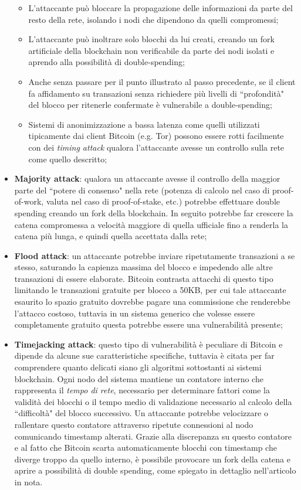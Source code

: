 \begin{itemize}
				\begin{itemize}
					\item L'attaccante può bloccare la propagazione delle informazioni da parte del resto della rete, isolando i nodi che dipendono da quelli compromessi;
					\item L'attaccante può inoltrare solo blocchi da lui creati, creando un fork artificiale della blockchain non verificabile da parte dei nodi isolati e aprendo alla possibilità di double-spending;
					\item Anche senza passare per il punto illustrato al passo precedente, se il client fa affidamento su transazioni senza richiedere più livelli di ``profondità" del blocco per ritenerle confermate è vulnerabile a double-spending;
					\item Sistemi di anonimizzazione a bassa latenza come quelli utilizzati tipicamente dai client Bitcoin (e.g. Tor) possono essere rotti facilmente con dei \emph{timing attack} qualora l'attaccante avesse un controllo sulla rete come quello descritto;
				\end{itemize}
				\item \textbf{Majority attack}: qualora un attaccante avesse il controllo della maggior parte del ``potere di consenso" nella rete (potenza di calcolo nel caso di proof-of-work, valuta nel caso di proof-of-stake, etc.) potrebbe effettuare double spending creando un fork della blockchain. In seguito potrebbe far crescere la catena compromessa a velocità maggiore di quella ufficiale fino a renderla la catena più lunga, e quindi quella accettata dalla rete;
				\item \textbf{Flood attack}: un attaccante potrebbe inviare ripetutamente transazioni a se stesso, saturando la capienza massima del blocco e impedendo alle altre transazioni di essere elaborate. Bitcoin contrasta attacchi di questo tipo limitando le transazioni gratuite per blocco a 50KB, per cui tale attaccante esaurito lo spazio gratuito dovrebbe pagare una commissione che renderebbe l'attacco costoso, tuttavia in un sistema generico che volesse essere completamente gratuito questa potrebbe essere una vulnerabilità presente;
				\item \textbf{Timejacking attack}\cite{timejacking}: questo tipo di vulnerabilità è peculiare di Bitcoin e dipende da alcune sue caratteristiche specifiche, tuttavia è citata per far comprendere quanto delicati siano gli algoritmi sottostanti ai sistemi blockchain. Ogni nodo del sistema mantiene un contatore interno che rappresenta il \emph{tempo di rete}, necessario per determinare fattori come la validità dei blocchi o il tempo medio di validazione necessario al calcolo della ``difficoltà" del blocco successivo. Un attaccante potrebbe velocizzare o rallentare questo contatore attraverso ripetute connessioni al nodo comunicando timestamp alterati. Grazie alla discrepanza su questo contatore e al fatto che Bitcoin scarta automaticamente blocchi con timestamp che diverge troppo da quello interno, è possibile provocare un fork della catena e aprire a possibilità di double spending, come spiegato in dettaglio nell'articolo in nota.
			\end{itemize}
